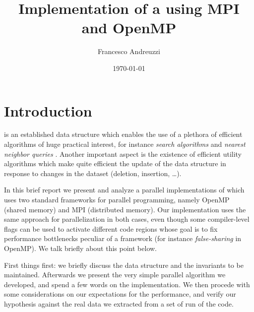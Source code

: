 \documentclass{article}
\title{Implementation of a \kdtree{} using MPI and OpenMP}
\author{Francesco Andreuzzi}
\date{\today}
\begin{document}
\maketitle



\section{Introduction} \label{sec:intro}
\kdtree{} is an established data structure which enables the use of a
plethora of efficient algorithms of huge practical interest, for instance
\emph{search algorithms} and \emph{nearest neighbor queries}
\cite{bentley1975multidimensional}. Another important aspect is the existence of
efficient utility algorithms which make quite efficient the update of the data
structure in response to changes in the dataset (deletion, insertion, \dots).

In this brief report we present and analyze a parallel implementations of
\kdtree{} which uses two standard frameworks for parallel programming, namely
OpenMP \cite{dagum1998openmp} (shared memory) and MPI \cite{mpi} (distributed
memory). Our implementation uses the same approach for parallelization in
both cases, even though some compiler-level flags can be used to activate
different code regions whose goal is to fix performance bottlenecks peculiar of
a framework (for instance \emph{false-sharing} in OpenMP). We talk
briefly about this point below.

First things first: we briefly discuss the data structure and the invariants to
be maintained. Afterwards we present the very simple parallel algorithm we
developed, and spend a few words on the implementation. We then procede with
some considerations on our expectations for the performance, and verify our
hypothesis against the real data we extracted from a set of run of the code.
\end{document}
